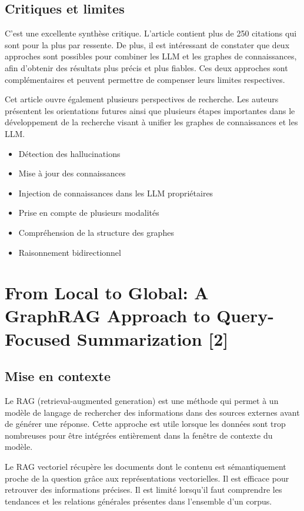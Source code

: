 \documentclass[12pt,a4paper]{report}
\begin{document}
\section{Critiques et limites}
C'est une excellente synthèse critique. L'article contient plus de 250 citations qui sont pour 
la plus par ressente. De plus, il est intéressant de constater que deux approches sont possibles 
pour combiner les LLM et les graphes de connaissances, afin d'obtenir des résultats plus 
précis et plus fiables. Ces deux approches sont complémentaires et peuvent permettre de compenser 
leurs limites respectives.

Cet article ouvre également plusieurs perspectives de recherche. Les auteurs présentent les 
orientations futures ainsi que plusieurs étapes importantes dans le développement de la 
recherche visant à unifier les graphes de connaissances et les LLM.
\begin{itemize}
    \item Détection des hallucinations
    \item Mise à jour des connaissances
    \item Injection de connaissances dans les LLM propriétaires
    \item Prise en compte de plusieurs modalités
    \item Compréhension de la structure des graphes
    \item Raisonnement bidirectionnel
\end{itemize}


\chapter{From Local to Global: A GraphRAG Approach to Query-Focused Summarization [2]}

\section{Mise en contexte}
Le RAG (retrieval-augmented generation) est une méthode qui permet à un modèle de langage de rechercher des informations dans des sources 
externes avant de générer une réponse. Cette approche est utile lorsque les données sont trop nombreuses 
pour être intégrées entièrement dans la fenêtre de contexte du modèle.

Le RAG vectoriel récupère les documents dont le contenu est sémantiquement proche de la question grâce 
aux représentations vectorielles. Il est efficace pour retrouver des informations précises. Il est limité 
lorsqu'il faut comprendre les tendances et les relations générales présentes dans l'ensemble d'un corpus.
\end{document}
